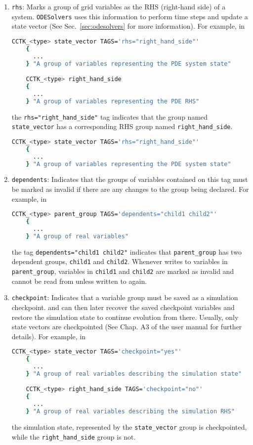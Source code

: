\begin{enumerate}
  \item \texttt{rhs}: Marks a group of grid variables as the RHS (right-hand side) of a system. \texttt{ODESolvers} uses this information to perform time steps and update a state vector (See Sec.~\ref{sec:odesolvers} for more information). For example, in
  \begin{lstlisting}[language=bash]
    CCTK_<type> state_vector TAGS='rhs="right_hand_side"'
    {
      ...
    } "A group of variables representing the PDE system state"

    CCTK_<type> right_hand_side
    {
      ...
    } "A group of variables representing the PDE RHS"
  \end{lstlisting}
  the \texttt{rhs="right\_hand\_side"} tag indicates that the group named \texttt{state\_vector} has a corresponding RHS group named \texttt{right\_hand\_side}.

  \begin{lstlisting}[language=bash]
    CCTK_<type> state_vector TAGS='rhs="right_hand_side"'
    {
      ...
    } "A group of variables representing the PDE system state"
  \end{lstlisting}
  
  \item \texttt{dependents}: Indicates that the groups of variables contained on this tag must be marked as invalid if there are any changes to the group being declared. For example, in
  \begin{lstlisting}[language=bash]
    CCTK_<type> parent_group TAGS='dependents="child1 child2"'
    {
      ...
    } "A group of real variables"
  \end{lstlisting}
  the tag \texttt{dependents="child1 child2"} indicates that \texttt{parent\_group} has two dependent groups, \texttt{child1} and \texttt{child2}. Whenever \CarpetX\space writes to variables in \texttt{parent\_group}, variables in \texttt{child1} and \texttt{child2} are marked as invalid and cannot be read from unless written to again.
  
  \item \texttt{checkpoint}: Indicates that a variable group must be saved as a simulation checkpoint. \Cactus\space and \CarpetX\space can then later recover the saved checkpoint variables and restore the simulation state to continue evolution from there. Usually, only state vectors are checkpointed (See Chap. A3 of the \Cactus user manual for further details). For example, in
  \begin{lstlisting}[language=bash]
    CCTK_<type> state_vector TAGS='checkpoint="yes"'
    {
      ...
    } "A group of real variables describing the simulation state"

    CCTK_<type> right_hand_side TAGS='checkpoint="no"'
    {
      ...
    } "A group of real variables describing the simulation RHS"
  \end{lstlisting}
  the simulation state, represented by the \texttt{state\_vector} group is checkpointed, while the \texttt{right\_hand\_side} group is not.
\end{enumerate}

